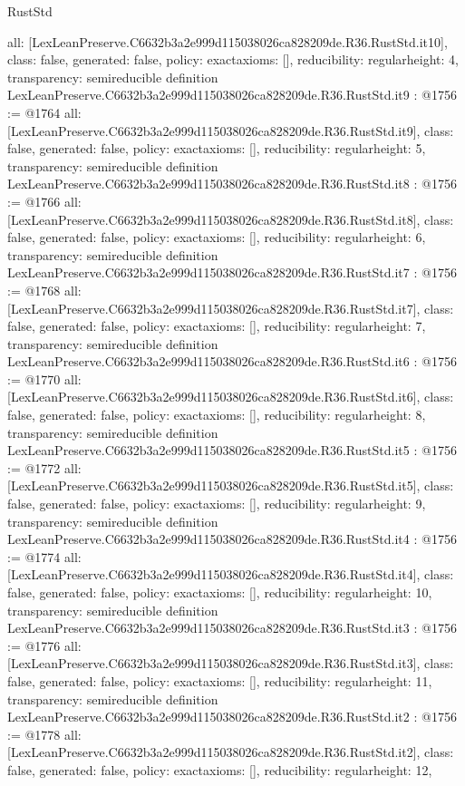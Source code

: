 \begin{lexlean}{RustStd}
\begin{coremodule}
{  all: [LexLeanPreserve.C6632b3a2e999d115038026ca828209de.R36.RustStd.it10],
  class: false,
  generated: false,
  policy: exact{axioms: []},
  reducibility: regular{height: 4},
  transparency: semireducible
}
definition LexLeanPreserve.C6632b3a2e999d115038026ca828209de.R36.RustStd.it9 : @1756 := @1764 {
  all: [LexLeanPreserve.C6632b3a2e999d115038026ca828209de.R36.RustStd.it9],
  class: false,
  generated: false,
  policy: exact{axioms: []},
  reducibility: regular{height: 5},
  transparency: semireducible
}
definition LexLeanPreserve.C6632b3a2e999d115038026ca828209de.R36.RustStd.it8 : @1756 := @1766 {
  all: [LexLeanPreserve.C6632b3a2e999d115038026ca828209de.R36.RustStd.it8],
  class: false,
  generated: false,
  policy: exact{axioms: []},
  reducibility: regular{height: 6},
  transparency: semireducible
}
definition LexLeanPreserve.C6632b3a2e999d115038026ca828209de.R36.RustStd.it7 : @1756 := @1768 {
  all: [LexLeanPreserve.C6632b3a2e999d115038026ca828209de.R36.RustStd.it7],
  class: false,
  generated: false,
  policy: exact{axioms: []},
  reducibility: regular{height: 7},
  transparency: semireducible
}
definition LexLeanPreserve.C6632b3a2e999d115038026ca828209de.R36.RustStd.it6 : @1756 := @1770 {
  all: [LexLeanPreserve.C6632b3a2e999d115038026ca828209de.R36.RustStd.it6],
  class: false,
  generated: false,
  policy: exact{axioms: []},
  reducibility: regular{height: 8},
  transparency: semireducible
}
definition LexLeanPreserve.C6632b3a2e999d115038026ca828209de.R36.RustStd.it5 : @1756 := @1772 {
  all: [LexLeanPreserve.C6632b3a2e999d115038026ca828209de.R36.RustStd.it5],
  class: false,
  generated: false,
  policy: exact{axioms: []},
  reducibility: regular{height: 9},
  transparency: semireducible
}
definition LexLeanPreserve.C6632b3a2e999d115038026ca828209de.R36.RustStd.it4 : @1756 := @1774 {
  all: [LexLeanPreserve.C6632b3a2e999d115038026ca828209de.R36.RustStd.it4],
  class: false,
  generated: false,
  policy: exact{axioms: []},
  reducibility: regular{height: 10},
  transparency: semireducible
}
definition LexLeanPreserve.C6632b3a2e999d115038026ca828209de.R36.RustStd.it3 : @1756 := @1776 {
  all: [LexLeanPreserve.C6632b3a2e999d115038026ca828209de.R36.RustStd.it3],
  class: false,
  generated: false,
  policy: exact{axioms: []},
  reducibility: regular{height: 11},
  transparency: semireducible
}
definition LexLeanPreserve.C6632b3a2e999d115038026ca828209de.R36.RustStd.it2 : @1756 := @1778 {
  all: [LexLeanPreserve.C6632b3a2e999d115038026ca828209de.R36.RustStd.it2],
  class: false,
  generated: false,
  policy: exact{axioms: []},
  reducibility: regular{height: 12},
}
\end{coremodule}
\end{lexlean}
